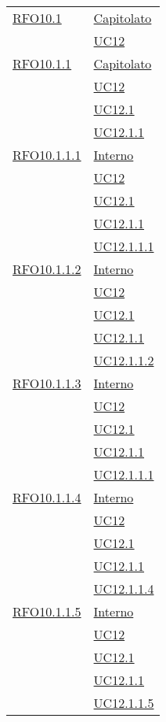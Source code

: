 \begin{longtable}{|>{\centering}m{5cm}|m{5cm}<{\centering}|}
 \hyperlink{RFO10.1}{RFO10.1} 
  & \hyperlink{Capitolato}{Capitolato}\\
& \hyperref[UC12]{UC12}\\\hline

 \hyperlink{RFO10.1.1}{RFO10.1.1} 
  & \hyperlink{Capitolato}{Capitolato}\\
& \hyperref[UC12]{UC12}\\
& \hyperref[UC12.1]{UC12.1}\\
& \hyperref[UC12.1.1]{UC12.1.1}\\\hline

 \hyperlink{RFO10.1.1.1}{RFO10.1.1.1} 
 & \hyperlink{Interno}{Interno}\\
& \hyperref[UC12]{UC12}\\
& \hyperref[UC12.1]{UC12.1}\\
& \hyperref[UC12.1.1]{UC12.1.1}\\
& \hyperref[UC12.1.1.1]{UC12.1.1.1}\\\hline

 \hyperlink{RFO10.1.1.2}{RFO10.1.1.2} 
 & \hyperlink{Interno}{Interno}\\
& \hyperref[UC12]{UC12}\\
& \hyperref[UC12.1]{UC12.1}\\
& \hyperref[UC12.1.1]{UC12.1.1}\\
& \hyperref[UC12.1.1.2]{UC12.1.1.2}\\\hline

 \hyperlink{RFO10.1.1.3}{RFO10.1.1.3} 
 & \hyperlink{Interno}{Interno}\\
& \hyperref[UC12]{UC12}\\
& \hyperref[UC12.1]{UC12.1}\\
& \hyperref[UC12.1.1]{UC12.1.1}\\
& \hyperref[UC12.1.1.1]{UC12.1.1.1}\\\hline

 \hyperlink{RFO10.1.1.4}{RFO10.1.1.4} 
 & \hyperlink{Interno}{Interno}\\
& \hyperref[UC12]{UC12}\\
& \hyperref[UC12.1]{UC12.1}\\
& \hyperref[UC12.1.1]{UC12.1.1}\\
& \hyperref[UC12.1.1.4]{UC12.1.1.4}\\\hline

 \hyperlink{RFO10.1.1.5}{RFO10.1.1.5} 
 & \hyperlink{Interno}{Interno}\\
& \hyperref[UC12]{UC12}\\
& \hyperref[UC12.1]{UC12.1}\\
& \hyperref[UC12.1.1]{UC12.1.1}\\
& \hyperref[UC12.1.1.5]{UC12.1.1.5}\\\hline


\end{longtable}
